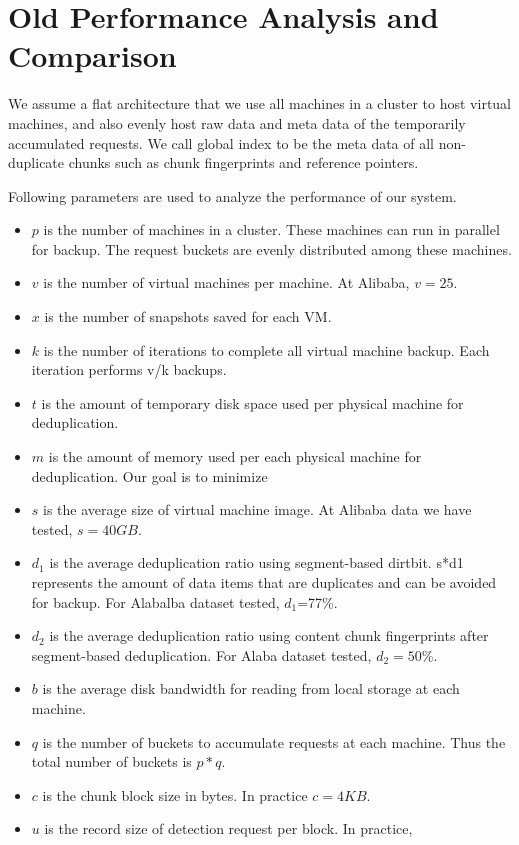 \section{ Old Performance Analysis and Comparison}
\label{sect:analysis-old}

We assume a flat architecture that we use all machines in a cluster to host virtual machines, and also evenly host  raw data and meta data of the temporarily accumulated requests.  We call global index to be the meta data of all non-duplicate chunks such as chunk fingerprints and reference pointers.

Following parameters are used to analyze the performance of our system.
\begin{itemize}
\item
$p$ is the number of machines in a cluster. These machines can run in parallel for backup. The request buckets are evenly distributed among these machines.
\item $v$ is the number of virtual machines per machine. At Alibaba, $v=25$.
\item $x$ is the number of snapshots saved for each VM.
\item $k$ is the number of iterations to complete all virtual machine backup. Each iteration performs v/k backups.
\item $t$  is the  amount of temporary disk space used per physical machine for deduplication.
\item $m$ is the amount of memory used per each physical machine for deduplication. Our goal is to minimize 
\item $s$ is the average size of virtual machine image. At Alibaba data we have tested, $s=40GB$.
\item $d_1$  is the average  deduplication ratio using  segment-based dirtbit.  s*d1 represents the amount of data items that are duplicates and can be avoided for backup. For Alabalba dataset tested, 
$d_1$=77\%.
\item $d_2$ is the average  deduplication ratio using content chunk fingerprints after segment-based deduplication. For Alaba dataset tested,  $d_2=50$\%.
\item $b$ is the average disk bandwidth for reading from local storage at each machine. 
\item $q$ is the number of buckets to accumulate requests at each machine. Thus the total number of buckets is $p*q$.
\item $c$ is the chunk block size in bytes.  In practice $c=4KB$.
\item $u$ is the record size of detection request per block.  In practice, 

\end{itemize}
